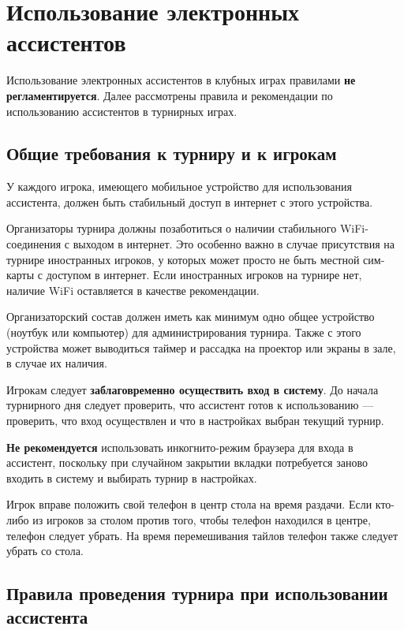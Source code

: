 \section{Использование электронных ассистентов}

Использование электронных ассистентов в клубных играх правилами \textbf{не регламентируется}. Далее рассмотрены правила и рекомендации по использованию ассистентов в турнирных играх.

\subsection{Общие требования к турниру и к игрокам}

У каждого игрока, имеющего мобильное устройство для использования ассистента, должен быть стабильный доступ в интернет с этого устройства.

Организаторы турнира должны позаботиться о наличии стабильного WiFi-соединения с выходом в интернет. Это особенно важно в случае присутствия на турнире иностранных игроков, у которых может просто не быть местной сим-карты с доступом в интернет. Если иностранных игроков на турнире нет, наличие WiFi оставляется в качестве рекомендации.

Организаторский состав должен иметь как минимум одно общее устройство (ноутбук или компьютер) для администрирования турнира. Также с этого устройства может выводиться таймер и рассадка на проектор или экраны в зале, в случае их наличия.

Игрокам следует \textbf{заблаговременно осуществить вход в систему}. До начала турнирного дня следует проверить, что ассистент готов к использованию --- проверить, что вход осуществлен и что в настройках выбран текущий турнир.

\textbf{Не рекомендуется} использовать инкогнито-режим браузера для входа в ассистент, поскольку при случайном закрытии вкладки потребуется заново входить в систему и выбирать турнир в настройках.

Игрок вправе положить свой телефон в центр стола на время раздачи. Если кто-либо из игроков за столом против того, чтобы телефон находился в центре, телефон следует убрать. На время перемешивания тайлов телефон также следует убрать со стола.

\subsection{Правила проведения турнира при использовании ассистента}

